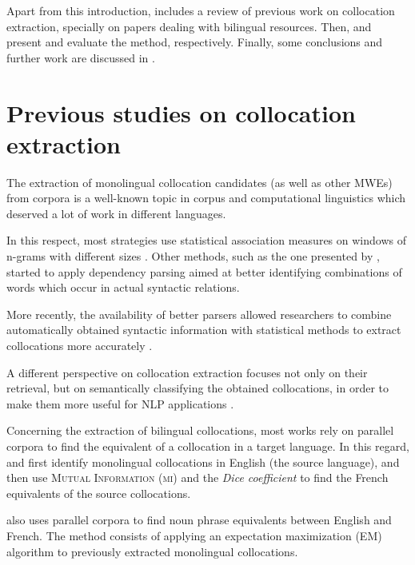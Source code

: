 \documentclass[output=paper
,modfonts
,nonflat]{langsci/langscibook}
\begin{document}
Apart from this introduction,  includes a review of previous work on collocation
extraction, specially on papers dealing with bilingual resources. Then, 
and  present and evaluate the method, respectively. Finally, some conclusions
and further work are discussed in .


%
\section{Previous studies on collocation extraction}
\label{garcia:sec:rw}

The extraction of monolingual collocation candidates (as well as other MWEs)
from corpora is a well-known topic in corpus and computational linguistics which deserved a
lot of work in different languages.

In this respect, most strategies use statistical association measures on windows of
n-grams with different sizes \citep{church1990, smadja1993}. Other methods, such as the
one presented by \citet{lin1999}, started to apply dependency parsing aimed at better identifying
combinations of words which occur in actual syntactic relations.

More recently, the availability of better parsers allowed researchers to combine automatically
obtained syntactic information with statistical methods to extract collocations more accurately \citep{evert2008,seretan2011syntax}.

A different perspective on collocation extraction focuses not only on their retrieval, but on
semantically classifying the obtained collocations, in order to make them more useful for NLP
applications \citep{wanner2006,wanner2016}.

Concerning the extraction of bilingual collocations, most works rely on parallel corpora to find the
equivalent of a collocation in a target language. In this regard, \citet{smadja1992} and \citet{smadja1996}
first identify monolingual collocations in English (the source language), and then use \textsc{Mutual
  Information} (\textsc{mi}) and the \emph{Dice coefficient} to find the French equivalents of the source
collocations.

\citet{kupiec1993} also uses parallel corpora to find noun phrase equivalents between English
and French. The method consists of applying an expectation maximization (EM) algorithm to previously
extracted monolingual collocations.
\end{document}
